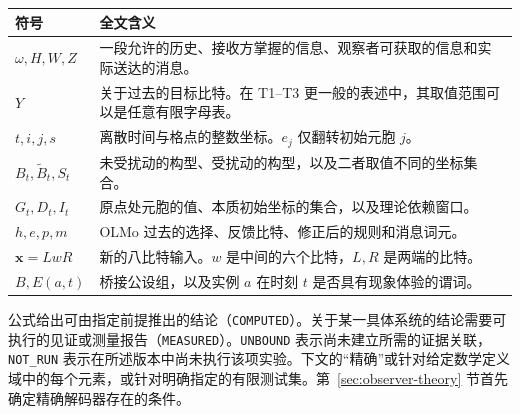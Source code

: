 \begin{center}\small
\begin{tabularx}{\linewidth}{@{}lX@{}}\toprule
符号 & 全文含义 \\\midrule
$\omega,H,W,Z$ & 一段允许的历史、接收方掌握的信息、观察者可获取的信息和实际送达的消息。\\
$Y$ & 关于过去的目标比特。在 T1--T3 更一般的表述中，其取值范围可以是任意有限字母表。\\
$t,i,j,s$ & 离散时间与格点的整数坐标。$e_j$ 仅翻转初始元胞 $j$。\\
$B_t,\widetilde B_t,S_t$ & 未受扰动的构型、受扰动的构型，以及二者取值不同的坐标集合。\\
$G_t,D_t,I_t$ & 原点处元胞的值、本质初始坐标的集合，以及理论依赖窗口。\\
$h,e,p,m$ & OLMo 过去的选择、反馈比特、修正后的规则和消息词元。\\
$\mathbf{x}=LwR$ & 新的八比特输入。$w$ 是中间的六个比特，$L,R$ 是两端的比特。\\
$B,E(a,t)$ & 桥接公设组，以及实例 $a$ 在时刻 $t$ 是否具有现象体验的谓词。\\
\bottomrule\end{tabularx}
\end{center}

公式给出可由指定前提推出的结论（\texttt{COMPUTED}）。关于某一具体系统的结论需要可执行的见证或测量报告（\texttt{MEASURED}）。\texttt{UNBOUND} 表示尚未建立所需的证据关联，\texttt{NOT\_RUN} 表示在所述版本中尚未执行该项实验。下文的“精确”或针对给定数学定义域中的每个元素，或针对明确指定的有限测试集。第~\ref{sec:observer-theory} 节首先确定精确解码器存在的条件。
